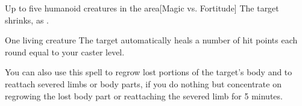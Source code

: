 \begin{spellheader}
    \spelldur{\durshort \dismissable}
\end{spellheader}
\begin{spelleffects}
    \begin{spelltargets}{Up to five humanoid creatures in the area}[Magic vs. Fortitude]
        \spellsuccess The target shrinks, as .
    \end{spelltargets}
\end{spelleffects}
\begin{spellfooter}
    
\end{spellfooter}

\begin{spellheader}
    \spelldur{\durshort}
\end{spellheader}
\begin{spelleffects}
    \begin{spelltarget}{One living creature}
        \spelleffect The target automatically heals a number of hit points each round equal to your caster level.
        \par You can also use this spell to regrow lost portions of the target's body and to reattach severed limbs or body parts, if you do nothing but concentrate on regrowing the lost body part or reattaching the severed limb for 5 minutes.
    \end{spelltarget}
\end{spelleffects}
\begin{spellfooter}
    
\end{spellfooter}

